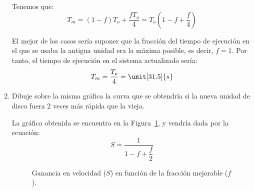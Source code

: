\begin{ejercicio}
\begin{enumerate}
    Tenemos que:
    \begin{equation*}
        T_m = (1-f)T_o + \dfrac{fT_o}{4} = T_o\left(1-f+\dfrac{f}{4}\right)
    \end{equation*}

    El mejor de los casos sería suponer que la fracción del tiempo de ejecución en el que se usaba la antigua unidad era la máxima posible, es decir, $f=1$. Por tanto, el tiempo de ejecución en el sistema actualizado sería:
    \begin{equation*}
        T_m = \dfrac{T_o}{4} = \unit[31.5]{s}
    \end{equation*}
    \item Dibuje sobre la misma gráfica la curva que se obtendría si la nueva unidad de disco fuera 2 veces más rápida que la vieja.
    
    La gráfica obtenida se encuentra en la Figura~\ref{fig:1_12_sol}, y vendría dada por la ecuación:
    \begin{equation*}
        S = \dfrac{1}{1-f+\dfrac{f}{2}}
    \end{equation*}

    \begin{figure}
        \centering
        \caption{Ganancia en velocidad ($S$) en función de la fracción mejorable ($f$).}
        \label{fig:1_12_sol}
    \end{figure}

\end{enumerate}
\end{ejercicio}
